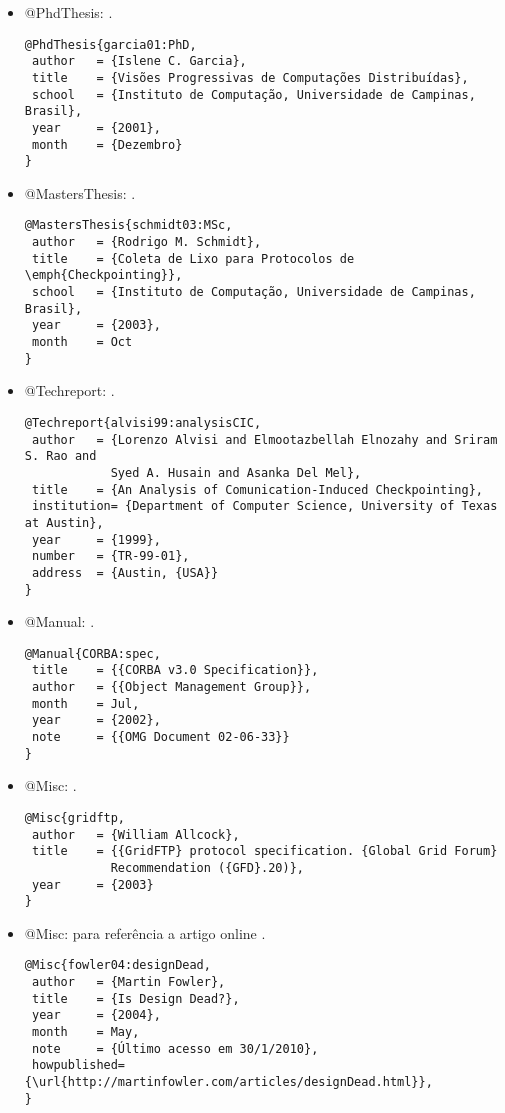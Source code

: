 \begin{itemize}
\item @PhdThesis: \citep{garcia01:PhD}.
{\scriptsize\begin{verbatim}
@PhdThesis{garcia01:PhD,
 author   = {Islene C. Garcia},
 title    = {Visões Progressivas de Computações Distribuídas},
 school   = {Instituto de Computação, Universidade de Campinas, Brasil},
 year     = {2001},
 month    = {Dezembro}
}
\end{verbatim}}

\item @MastersThesis: \citep{schmidt03:MSc}.
{\scriptsize\begin{verbatim}
@MastersThesis{schmidt03:MSc,
 author   = {Rodrigo M. Schmidt},
 title    = {Coleta de Lixo para Protocolos de \emph{Checkpointing}},
 school   = {Instituto de Computação, Universidade de Campinas, Brasil},
 year     = {2003},
 month    = Oct
}
\end{verbatim}}

\item @Techreport: \citep{alvisi99:analysisCIC}.
{\scriptsize\begin{verbatim}
@Techreport{alvisi99:analysisCIC,
 author   = {Lorenzo Alvisi and Elmootazbellah Elnozahy and Sriram S. Rao and
            Syed A. Husain and Asanka Del Mel},
 title    = {An Analysis of Comunication-Induced Checkpointing},
 institution= {Department of Computer Science, University of Texas at Austin},
 year     = {1999},
 number   = {TR-99-01},
 address  = {Austin, {USA}}
}
\end{verbatim}}

\item @Manual: \citep{CORBA:spec}.
{\scriptsize\begin{verbatim}
@Manual{CORBA:spec,
 title    = {{CORBA v3.0 Specification}},
 author   = {{Object Management Group}},
 month    = Jul,
 year     = {2002},
 note     = {{OMG Document 02-06-33}}
}
\end{verbatim}}

\item @Misc: \citep{gridftp}.
{\scriptsize\begin{verbatim}
@Misc{gridftp,
 author   = {William Allcock},
 title    = {{GridFTP} protocol specification. {Global Grid Forum}
            Recommendation ({GFD}.20)},
 year     = {2003}
}
\end{verbatim}}

\item @Misc: para referência a artigo online \citep{fowler04:designDead}.
{\scriptsize\begin{verbatim}
@Misc{fowler04:designDead,
 author   = {Martin Fowler},
 title    = {Is Design Dead?},
 year     = {2004},
 month    = May,
 note     = {Último acesso em 30/1/2010},
 howpublished= {\url{http://martinfowler.com/articles/designDead.html}},
}
\end{verbatim}}


\end{itemize}
